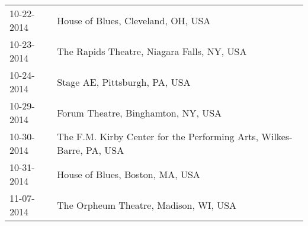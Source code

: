 \begin{supertabular}{ll}
 10-22-2014 &                                    House of Blues, Cleveland, OH, USA \\
 10-23-2014 &                            The Rapids Theatre, Niagara Falls, NY, USA \\
 10-24-2014 &                                         Stage AE, Pittsburgh, PA, USA \\
 10-29-2014 &                                    Forum Theatre, Binghamton, NY, USA \\
 10-30-2014 &  The F.M. Kirby Center for the Performing Arts, Wilkes-Barre, PA, USA \\
 10-31-2014 &                                       House of Blues, Boston, MA, USA \\
 11-07-2014 &                                 The Orpheum Theatre, Madison, WI, USA \\
\end{supertabular}
